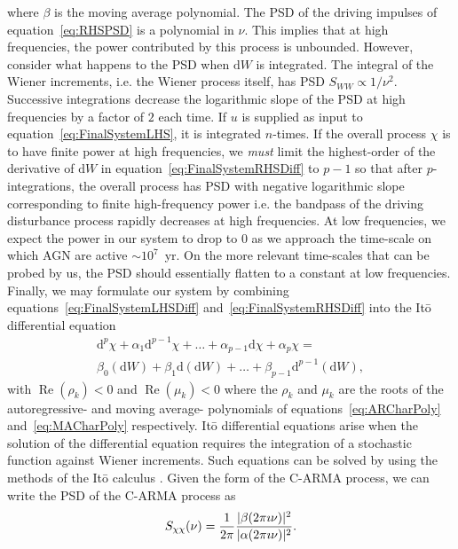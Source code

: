 \documentclass[a4paper,fleqn,usenatbib]{mnras}
\begin{document}
where $\beta$ is the moving average polynomial. The PSD of the driving impulses of equation~\eqref{eq:RHSPSD} is a polynomial in $\nu$. This implies that at high frequencies, the power contributed by this process is unbounded. However, consider what happens to the PSD when $\mathrm{d}W$ is integrated. The integral of the Wiener increments, i.e. the Wiener process itself, has PSD $S_{WW} \propto 1/\nu^{2}$. Successive integrations decrease the logarithmic slope of the PSD at high frequencies by a factor of $2$ each time. If $u$ is supplied as input to equation~\eqref{eq:FinalSystemLHS}, it is integrated $n$-times. If the overall process $\chi$ is to have finite power at high frequencies, we \textit{must} limit the highest-order of the derivative of $\mathrm{d}W$ in equation~\eqref{eq:FinalSystemRHSDiff} to $p-1$ so that after $p$-integrations, the overall process has PSD with negative logarithmic slope corresponding to finite high-frequency power i.e. the bandpass of the driving disturbance process rapidly decreases at high frequencies. At low frequencies, we expect the power in our system to drop to $0$ as we approach the time-scale on which AGN are active $\sim 10^{7}$~yr. On the more relevant time-scales that can be probed by us, the PSD should essentially flatten to a constant at low frequencies. Finally, we may formulate our system by combining equations~\eqref{eq:FinalSystemLHSDiff} and~\eqref{eq:FinalSystemRHSDiff} into the It\={o} differential equation
\begin{multline}\label{eq:CARMA}
\mathrm{d}^{p}\chi + \alpha_{1} \mathrm{d}^{p-1}\chi + \ldots + \alpha_{p-1} \mathrm{d}\chi + \alpha_{p} \chi = \\ \beta_{0} (\mathrm{d}W) + \beta_{1} \mathrm{d}(\mathrm{d}W) + \ldots + \beta_{p-1} \mathrm{d}^{p-1}(\mathrm{d}W),
\end{multline}
with $\operatorname{Re}(\rho_{k}) < 0$ and $\operatorname{Re}(\mu_{k}) < 0$ where the $\rho_{k}$ and $\mu_{k}$ are the roots of the autoregressive- and moving average- polynomials of equations~\eqref{eq:ARCharPoly} and~\eqref{eq:MACharPoly} respectively. It\={o} differential equations arise when the solution of the differential equation requires the integration of a stochastic function against Wiener increments. Such equations can be solved by using the methods of the It\={o} calculus \citep{Oksendal}. Given the form of the C-ARMA process, we can write the PSD of the C-ARMA process \citep{HandbookOfStatistics19Brockwell} as 
\begin{equation}\label{eq:CARMAPSD}
S_{\chi\chi}(\nu) = \frac{1}{2 \pi }\frac{|\beta(2 \pi \imath \nu)|^{2}}{|\alpha(2 \pi \imath \nu)|^{2}}.
\end{equation}
\end{document}
